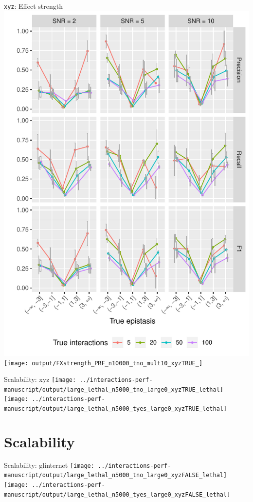 \begin{frame}{\texttt{xyz}: Effect strength}
\includegraphics[width=0.5\linewidth]{output/FXstrength_PRF_n1000_tno_mult1_xyzTRUE_}%
\texttt{[image: output/FXstrength\_PRF\_n10000\_tno\_mult10\_xyzTRUE\_]}
\end{frame}




\begin{frame}{Scalability: xyz}
\texttt{[image: ../interactions-perf-manuscript/output/large\_lethal\_n5000\_tno\_large0\_xyzTRUE\_lethal]}%
\texttt{[image: ../interactions-perf-manuscript/output/large\_lethal\_n5000\_tyes\_large0\_xyzTRUE\_lethal]}
\end{frame}

\section{Scalability}
\begin{frame}{Scalability: glinternet}
\texttt{[image: ../interactions-perf-manuscript/output/large\_lethal\_n5000\_tno\_large0\_xyzFALSE\_lethal]}%
\texttt{[image: ../interactions-perf-manuscript/output/large\_lethal\_n5000\_tyes\_large0\_xyzFALSE\_lethal]}
\end{frame}

